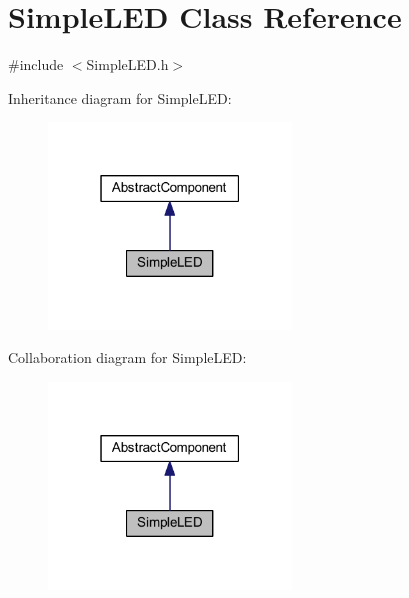 \hypertarget{class_simple_l_e_d}{}\section{Simple\+L\+ED Class Reference}
\label{class_simple_l_e_d}


{\ttfamily \#include $<$Simple\+L\+E\+D.\+h$>$}



Inheritance diagram for Simple\+L\+ED\+:\nopagebreak
\begin{figure}[H]
\begin{center}
\leavevmode
\includegraphics[width=183pt]{class_simple_l_e_d__inherit__graph}
\end{center}
\end{figure}


Collaboration diagram for Simple\+L\+ED\+:\nopagebreak
\begin{figure}[H]
\begin{center}
\leavevmode
\includegraphics[width=183pt]{class_simple_l_e_d__coll__graph}
\end{center}
\end{figure}
